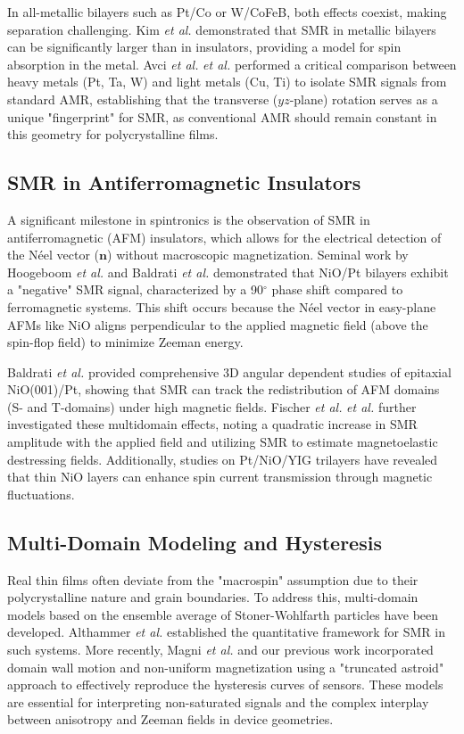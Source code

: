 \documentclass[11pt,a4paper]{article}
\begin{document}
In all-metallic bilayers such as Pt/Co or W/CoFeB, both effects coexist, making separation challenging. Kim \textit{et al.} \cite{kim2016spin} demonstrated that SMR in metallic bilayers can be significantly larger than in insulators, providing a model for spin absorption in the metal. Avci \textit{et al.} \textit{et al.} \cite{avci2015magnetoresistance} performed a critical comparison between heavy metals (Pt, Ta, W) and light metals (Cu, Ti) to isolate SMR signals from standard AMR, establishing that the transverse ($yz$-plane) rotation serves as a unique "fingerprint" for SMR, as conventional AMR should remain constant in this geometry for polycrystalline films.

\subsection{SMR in Antiferromagnetic Insulators}
A significant milestone in spintronics is the observation of SMR in antiferromagnetic (AFM) insulators, which allows for the electrical detection of the Néel vector ($\mathbf{n}$) without macroscopic magnetization. Seminal work by Hoogeboom \textit{et al.} \cite{hoogeboom2017negative} and Baldrati \textit{et al.} \cite{baldrati2018full} demonstrated that NiO/Pt bilayers exhibit a "negative" SMR signal, characterized by a 90$^\circ$ phase shift compared to ferromagnetic systems. This shift occurs because the Néel vector in easy-plane AFMs like NiO aligns perpendicular to the applied magnetic field (above the spin-flop field) to minimize Zeeman energy.

Baldrati \textit{et al.} \cite{baldrati2018full, baldrati2018anisotropic} provided comprehensive 3D angular dependent studies of epitaxial NiO(001)/Pt, showing that SMR can track the redistribution of AFM domains (S- and T-domains) under high magnetic fields. Fischer \textit{et al.} \textit{et al.} \cite{fischer2018spin} further investigated these multidomain effects, noting a quadratic increase in SMR amplitude with the applied field and utilizing SMR to estimate magnetoelastic destressing fields. Additionally, studies on Pt/NiO/YIG trilayers \cite{lin2016antiferromagnetic, hou2017tunable} have revealed that thin NiO layers can enhance spin current transmission through magnetic fluctuations.

\subsection{Multi-Domain Modeling and Hysteresis}
Real thin films often deviate from the "macrospin" assumption due to their polycrystalline nature and grain boundaries. To address this, multi-domain models based on the ensemble average of Stoner-Wohlfarth particles have been developed. Althammer \textit{et al.} \cite{althammer2013quantitative} established the quantitative framework for SMR in such systems. More recently, Magni \textit{et al.} \cite{magni2022spin} and our previous work \cite{farwa_2026} incorporated domain wall motion and non-uniform magnetization using a "truncated astroid" approach to effectively reproduce the hysteresis curves of sensors. These models are essential for interpreting non-saturated signals and the complex interplay between anisotropy and Zeeman fields in device geometries.
\end{document}
